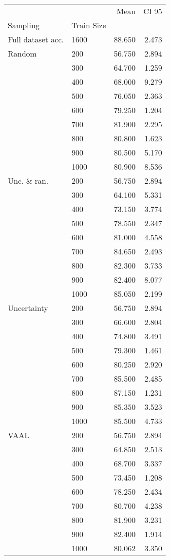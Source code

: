 \begin{tabular}{llrr}
\toprule
     &      &    Mean &  CI 95 \\
Sampling & Train Size &         &        \\
\midrule
Full dataset acc. & 1600 &  88.650 &  2.473 \\
Random & 200  &  56.750 &  2.894 \\
     & 300  &  64.700 &  1.259 \\
     & 400  &  68.000 &  9.279 \\
     & 500  &  76.050 &  2.363 \\
     & 600  &  79.250 &  1.204 \\
     & 700  &  81.900 &  2.295 \\
     & 800  &  80.800 &  1.623 \\
     & 900  &  80.500 &  5.170 \\
     & 1000 &  80.900 &  8.536 \\
Unc. \& ran. & 200  &  56.750 &  2.894 \\
     & 300  &  64.100 &  5.331 \\
     & 400  &  73.150 &  3.774 \\
     & 500  &  78.550 &  2.347 \\
     & 600  &  81.000 &  4.558 \\
     & 700  &  84.650 &  2.493 \\
     & 800  &  82.300 &  3.733 \\
     & 900  &  82.400 &  8.077 \\
     & 1000 &  85.050 &  2.199 \\
Uncertainty & 200  &  56.750 &  2.894 \\
     & 300  &  66.600 &  2.804 \\
     & 400  &  74.800 &  3.491 \\
     & 500  &  79.300 &  1.461 \\
     & 600  &  80.250 &  2.920 \\
     & 700  &  85.500 &  2.485 \\
     & 800  &  87.150 &  1.231 \\
     & 900  &  85.350 &  3.523 \\
     & 1000 &  85.500 &  4.733 \\
VAAL & 200  &  56.750 &  2.894 \\
     & 300  &  64.850 &  2.513 \\
     & 400  &  68.700 &  3.337 \\
     & 500  &  73.450 &  1.208 \\
     & 600  &  78.250 &  2.434 \\
     & 700  &  80.700 &  4.238 \\
     & 800  &  81.900 &  3.231 \\
     & 900  &  82.400 &  1.914 \\
     & 1000 &  80.062 &  3.350 \\
\bottomrule
\end{tabular}
